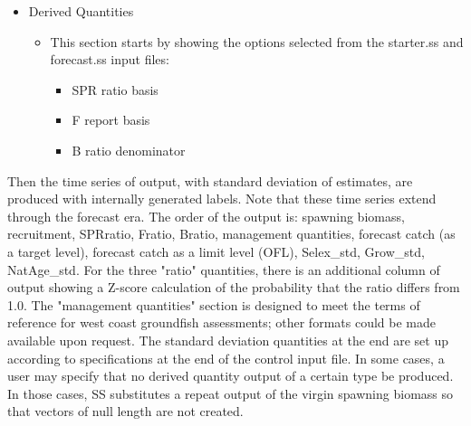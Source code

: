 \begin{itemize}
\begin{itemize}
		\end{itemize}
	\item Derived Quantities
		\begin{itemize}
			\item This section starts by showing the options selected from the starter.ss and forecast.ss input files:
				\begin{itemize}
					\item SPR ratio basis
					\item F report basis
					\item B ratio denominator
				\end{itemize}
		\end{itemize}
\end{itemize}

Then the time series of output, with standard deviation of estimates, are produced with internally generated labels.  Note that these time series extend through the forecast era.  The order of the output is: spawning biomass, recruitment, SPRratio, Fratio, Bratio, management quantities, forecast catch (as a target level), forecast catch as a limit level (OFL), Selex\_std, Grow\_std, NatAge\_std.  For the three "ratio" quantities, there is an additional column of output showing a Z-score calculation of the probability that the ratio differs from 1.0. The "management quantities" section is designed to meet the terms of reference for west coast groundfish assessments; other formats could be made available upon request. The standard deviation quantities at the end are set up according to specifications at the end of the control input file. In some cases, a user may specify that no derived quantity output of a certain type be produced. In those cases, SS substitutes a repeat output of the virgin spawning biomass so that vectors of null length are not created.

